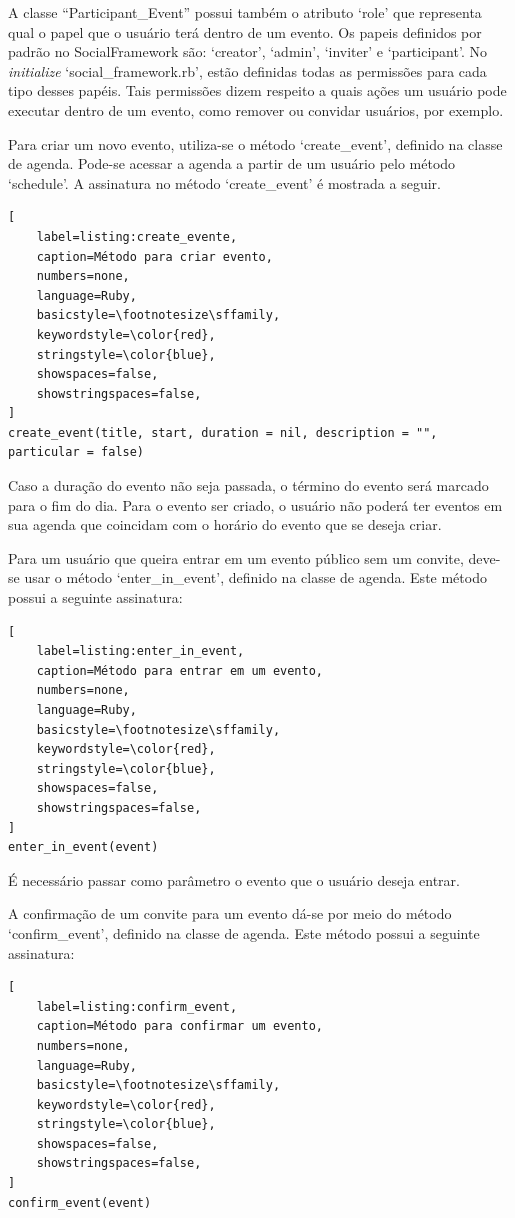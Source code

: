 A classe ``Participant\_Event'' possui também o atributo `role' que representa qual o papel que o usuário terá dentro de um evento. Os papeis definidos por padrão no SocialFramework são: `creator', `admin', `inviter' e `participant'. No \textit{initialize} `social\_framework.rb', estão definidas todas as permissões para cada tipo desses papéis. Tais permissões dizem respeito a quais ações um usuário pode executar dentro de um evento, como remover ou convidar usuários, por exemplo.

Para criar um novo evento, utiliza-se o método `create\_event', definido na classe de agenda. Pode-se acessar a agenda a partir de um usuário pelo método `schedule'. A assinatura no método `create\_event' é mostrada a seguir.

\begin{lstlisting}[
    label=listing:create_evente,
    caption=Método para criar evento,
    numbers=none,
    language=Ruby,
    basicstyle=\footnotesize\sffamily,
    keywordstyle=\color{red},
    stringstyle=\color{blue},
    showspaces=false,
    showstringspaces=false,
]
create_event(title, start, duration = nil, description = "", particular = false)
\end{lstlisting}

Caso a duração do evento não seja passada, o término do evento será marcado para o fim do dia.
Para o evento ser criado, o usuário não poderá ter eventos em sua agenda que coincidam com o horário do evento que se deseja criar.

Para um usuário que queira entrar em um evento público sem um convite, deve-se usar o método `enter\_in\_event', definido na classe de agenda. Este método possui a seguinte assinatura:

\begin{lstlisting}[
    label=listing:enter_in_event,
    caption=Método para entrar em um evento,
    numbers=none,
    language=Ruby,
    basicstyle=\footnotesize\sffamily,
    keywordstyle=\color{red},
    stringstyle=\color{blue},
    showspaces=false,
    showstringspaces=false,
]
enter_in_event(event)
\end{lstlisting}

É necessário passar como parâmetro o evento que o usuário deseja entrar.

A confirmação de um convite para um evento dá-se por meio do método `confirm\_event', definido na classe de agenda. Este método possui a seguinte assinatura:

\begin{lstlisting}[
    label=listing:confirm_event,
    caption=Método para confirmar um evento,
    numbers=none,
    language=Ruby,
    basicstyle=\footnotesize\sffamily,
    keywordstyle=\color{red},
    stringstyle=\color{blue},
    showspaces=false,
    showstringspaces=false,
]
confirm_event(event)
\end{lstlisting}

